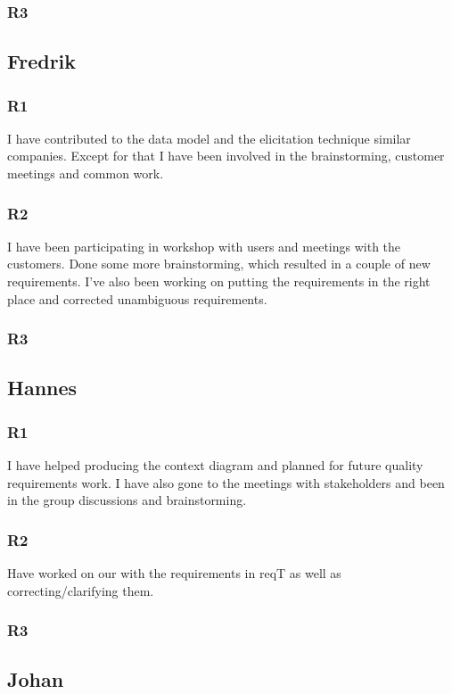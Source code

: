 \documentclass[a4paper]{article}
\begin{document}
		\subsubsection{R3}
	
	\subsection{Fredrik}
		\subsubsection{R1}
		I have contributed to the data model and the elicitation technique similar companies. Except for that I have been involved in the brainstorming, customer meetings and common work.
		\subsubsection{R2}
		I have been participating in workshop with users and meetings with the customers. Done some more brainstorming, which resulted in a couple of new requirements. I've also been working on putting the requirements in the right place and corrected unambiguous requirements.
		\subsubsection{R3}
		
	\subsection{Hannes}
		\subsubsection{R1}
		I have helped producing the context diagram and planned for future quality requirements work. I have also gone to the meetings with stakeholders and been in the group discussions and brainstorming.
		\subsubsection{R2}
		Have worked on our with the requirements in reqT as well as correcting/clarifying them.  
		\subsubsection{R3}
	
	\subsection{Johan}
\end{document}

